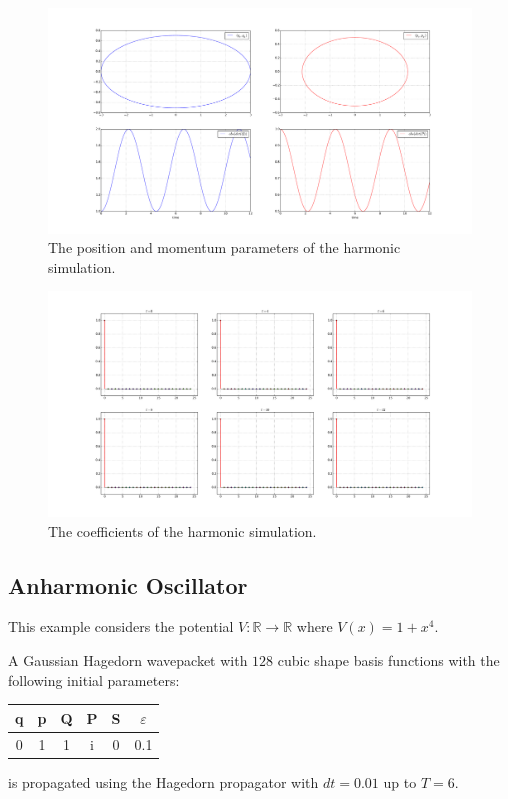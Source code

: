 \begin{figure}[!ht]
\includegraphics[width=\textwidth]{Figures/harmonic_params.pdf}
\caption{The position and momentum parameters of the harmonic simulation.}
\label{fig:harmonic_params}
\end{figure}
\begin{figure}[!ht]
\includegraphics[width=\textwidth]{Figures/harmonic_coeffs.pdf}
\caption{The coefficients of the harmonic simulation.}
\label{fig:harmonic_coeffs}
\end{figure}

\FloatBarrier


\subsection{Anharmonic Oscillator}
This example considers the potential $V: \mathbb{R} \rightarrow \mathbb{R}$ where $V(x) = 1 + x^4$.

A Gaussian Hagedorn wavepacket with $128$ cubic shape basis functions with the following initial parameters:
\begin{center}
 \begin{tabular}{|c c c c c c|} 
 \hline
 q & p & Q & P & S & $\varepsilon$\\ [0.5ex] 
 \hline
 0 & 1 & 1 & i & 0 & 0.1\\ 
 \hline
\end{tabular}
\end{center}
is propagated using the Hagedorn propagator with $dt = 0.01$ up to $T = 6$.

